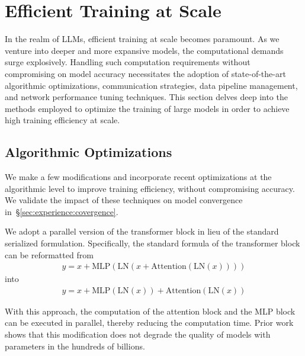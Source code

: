 \section{Efficient Training at Scale}
\label{sec:train}

In the realm of LLMs, efficient training at scale becomes paramount. As we venture into deeper and more expansive models, the computational demands surge explosively. Handling such computation requirements without compromising on model accuracy necessitates the adoption of state-of-the-art algorithmic optimizations, communication strategies, data pipeline management, and network performance tuning techniques. This section delves deep into the methods employed to optimize the training of large models in order to achieve high training efficiency at scale.

\subsection{Algorithmic Optimizations}
\label{sec:algorithm}

We make a few modifications and incorporate recent optimizations at
the algorithmic level to improve training efficiency, without compromising
accuracy. We validate
the impact of these techniques on model convergence in~\S\ref{sec:experience:covergence}.


 We adopt a parallel version of the transformer block in lieu of the standard serialized formulation. 
Specifically, the standard formula of the transformer block can be reformatted from 
\begin{equation}
    \begin{aligned}
        y = x + \text{MLP}(\text{LN}(x + \text{Attention}(\text{LN}(x))))
    \end{aligned}
\end{equation}
into
\begin{equation}
    \begin{aligned}
        y = x + \text{MLP}(\text{LN}(x)) + \text{Attention}(\text{LN}(x))
    \end{aligned}
\end{equation}

With this approach, the computation of the attention block and the MLP block can
be executed in parallel, thereby reducing the computation time. Prior
work~\cite{chowdhery2022palm} shows that this modification does not degrade the
quality of models with parameters in the hundreds of billions.


